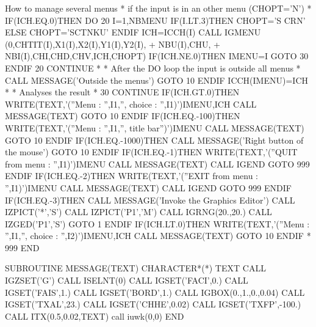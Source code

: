 \begin{XMPt}{How to manage several menus}
*       if the input is in an other menu (CHOPT='N')
*
      IF(ICH.EQ.0)THEN
         DO 20  I=1,NBMENU
            IF(I.LT.3)THEN
               CHOPT='S CRN'
            ELSE
               CHOPT='SCTNKU'
            ENDIF
            ICH=ICCH(I)
            CALL IGMENU (0,CHTIT(I),X1(I),X2(I),Y1(I),Y2(I),
     +                   NBU(I),CHU,
     +                   NBI(I),CHI,CHD,CHV,ICH,CHOPT)
            IF(ICH.NE.0)THEN
               IMENU=I
               GOTO 30
            ENDIF
   20    CONTINUE
*
*       After the DO loop the input is outside all menus
*
         CALL MESSAGE('Outside the menus')
         GOTO 10
      ENDIF
      ICCH(IMENU)=ICH
*
*       Analyses the result
*
   30 CONTINUE
      IF(ICH.GT.0)THEN
         WRITE(TEXT,'(''Menu : '',I1,'', choice : '',I1)')IMENU,ICH
         CALL MESSAGE(TEXT)
         GOTO 10
      ENDIF
      IF(ICH.EQ.-100)THEN
         WRITE(TEXT,'(''Menu : '',I1,'', title bar'')')IMENU
         CALL MESSAGE(TEXT)
         GOTO 10
      ENDIF
      IF(ICH.EQ.-1000)THEN
         CALL MESSAGE('Right button of the mouse')
         GOTO 10
      ENDIF
      IF(ICH.EQ.-1)THEN
         WRITE(TEXT,'(''QUIT from menu : '',I1)')IMENU
         CALL MESSAGE(TEXT)
         CALL IGEND
         GOTO 999
      ENDIF
      IF(ICH.EQ.-2)THEN
         WRITE(TEXT,'(''EXIT from menu : '',I1)')IMENU
         CALL MESSAGE(TEXT)
         CALL IGEND
         GOTO 999
      ENDIF
      IF(ICH.EQ.-3)THEN
         CALL MESSAGE('Invoke the Graphics Editor')
         CALL IZPICT('*','S')
         CALL IZPICT('P1','M')
         CALL IGRNG(20.,20.)
         CALL IZGED('P1','S')
         GOTO 1
      ENDIF
      IF(ICH.LT.0)THEN
        WRITE(TEXT,'(''Menu : '',I1,'', choice : '',I2)')IMENU,ICH
         CALL MESSAGE(TEXT)
         GOTO 10
      ENDIF
*
  999 END
 
      SUBROUTINE MESSAGE(TEXT)
      CHARACTER*(*) TEXT
      CALL IGZSET('G')
      CALL ISELNT(0)
      CALL IGSET('FACI',0.)
      CALL IGSET('FAIS',1.)
      CALL IGSET('BORD',1.)
      CALL IGBOX(0.,1.,0.,0.04)
      CALL IGSET('TXAL',23.)
      CALL IGSET('CHHE',0.02)
      CALL IGSET('TXFP',-100.)
      CALL ITX(0.5,0.02,TEXT)
      call iuwk(0,0)
      END
\end{XMPt}
